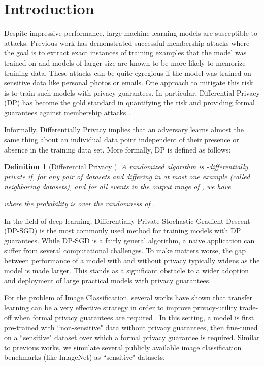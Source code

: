 \documentclass[letterpaper]{article} \usepackage{fullpage}
\newtheorem{definition}[lem]{Definition}
\begin{document}
\section{Introduction}
Despite impressive performance, large machine learning models are susceptible to attacks. Previous work has demonstrated successful membership attacks where the goal is to extract exact instances of training examples that the model was trained on \citep{shokri2017membership,carlini2019secret, carlini2020extracting,choquettechoo2020labelonly,liu2021mldoctor,balle2022reconstructing} and models of larger size are known to be more likely to memorize training data. These attacks can be quite egregious if the model was trained on sensitive data like personal photos or emails. One approach to mitigate this risk is to train such models with privacy guarantees. In particular, Differential Privacy (DP) has become the gold standard in quantifying the risk and providing formal guarantees against membership attacks \citep{adv_inst2021}.

Informally, Differentially Privacy implies that an adversary learns almost the same thing about an individual data point independent of their presence or absence in the training data set. More formally, DP is defined as follows:
\begin{definition}
[Differential Privacy \citep{dwork2006dp,ODO}] A randomized algorithm  is -differentially private if, for any pair of datasets  and  differing in at most one example (called {\em neighboring datasets}), and for all events  in the output range of , we have 

where the probability is over the randomness of .
\label{def:dp}
\end{definition}

In the field of deep learning, Differentially Private Stochastic Gradient Descent (DP-SGD) \citep{song2013stochastic,Bassily_2014,abadi2016dpsgd} is the most commonly used method for training models with DP guarantees. While DP-SGD is a fairly general algorithm, a naive application can suffer from several computational challenges. To make matters worse, the gap between performance of a model with and without privacy typically widens as the model is made larger. This stands as a significant obstacle to a wider adoption and deployment of large practical models with privacy guarantees.

For the problem of Image Classification, several works have shown that transfer learning can be a very effective strategy in order to improve privacy-utility trade-off when formal privacy guarantees are required \citep{kurakin2022training,mehta2022large,dm_transfer_2022}. In this setting, a model is first pre-trained with ``non-sensitive" data without privacy guarantees, then fine-tuned on a ``sensitive" dataset over which a formal privacy guarantee is required. Similar to previous works, we simulate several publicly available image classification benchmarks (like ImageNet) as ``sensitive" datasets.
\end{document}
